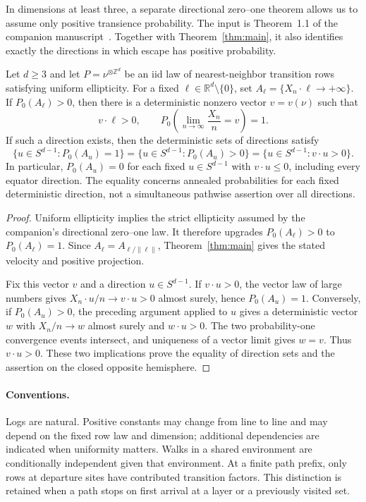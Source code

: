 In dimensions at least three, a separate directional zero--one theorem
allows us to assume only positive transience probability. The input is
Theorem~1.1 of the companion manuscript~\cite{OpenAIDirectionalZeroOne2026}. Together with Theorem~\ref{thm:main}, it also identifies
exactly the directions in which escape has positive probability.

\begin{corollary}\label{cor:positive-transience}
Let $d\ge3$ and let $P=\nu^{\otimes\mathbb Z^d}$ be an iid law of
nearest-neighbor transition rows satisfying uniform ellipticity. For a
fixed $\ell\in\mathbb R^d\setminus\{0\}$, set
$A_\ell=\{X_n\cdot\ell\longrightarrow+\infty\}$. If $P_0(A_\ell)>0$,
then there is a deterministic nonzero vector $v=v(\nu)$ such that
\[
 v\cdot\ell>0,
 \qquad
 P_0\!\left(\lim_{n\to\infty}\frac{X_n}{n}=v\right)=1.
\]
If such a direction exists, then the deterministic sets of directions
satisfy
\[
 \{u\in S^{d-1}:P_0(A_u)=1\}
 =\{u\in S^{d-1}:P_0(A_u)>0\}
 =\{u\in S^{d-1}:v\cdot u>0\}.
\]
In particular, $P_0(A_u)=0$ for each fixed $u\in S^{d-1}$ with
$v\cdot u\le0$, including every equator direction. The equality concerns
annealed probabilities for each fixed deterministic direction, not a
simultaneous pathwise assertion over all directions.
\end{corollary}

\begin{proof}
Uniform ellipticity implies the strict ellipticity assumed by the
companion's directional zero--one law. It therefore upgrades
$P_0(A_\ell)>0$ to $P_0(A_\ell)=1$. Since
$A_\ell=A_{\ell/\|\ell\|}$, Theorem~\ref{thm:main} gives the stated
velocity and positive projection.

Fix this vector $v$ and a direction $u\in S^{d-1}$. If $v\cdot u>0$,
the vector law of large numbers gives $X_n\cdot u/n\to v\cdot u>0$
almost surely, hence $P_0(A_u)=1$. Conversely, if $P_0(A_u)>0$, the
preceding argument applied to $u$ gives a deterministic vector $w$ with
$X_n/n\to w$ almost surely and $w\cdot u>0$. The two probability-one
convergence events intersect, and uniqueness of a vector limit gives
$w=v$. Thus $v\cdot u>0$. These two implications prove the equality of
direction sets and the assertion on the closed opposite hemisphere.
\end{proof}

\paragraph{Conventions.}
Logs are natural. Positive constants may change from line to line and
may depend on the fixed row law and dimension; additional dependencies
are indicated when uniformity matters. Walks in a shared environment
are conditionally independent given that environment. At a finite path
prefix, only rows at departure sites have contributed transition factors.
This distinction is retained when a path stops on first arrival at a
layer or a previously visited set.
